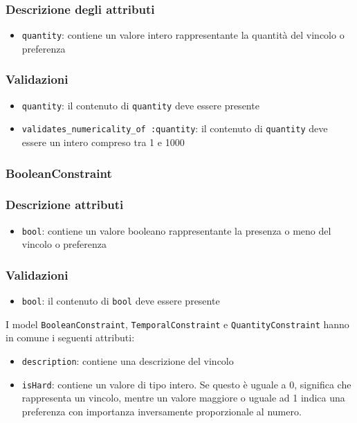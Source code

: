 \documentclass[11pt,a4paper]{article}
\begin{document}
\subsubsection*{Descrizione degli attributi}
\begin{itemize}
 \item \verb|quantity|: contiene un valore intero rappresentante la quantità del vincolo o preferenza
\end{itemize}
\subsubsection*{Validazioni}
\begin{itemize}
 \item \verb|quantity|: il contenuto di \verb|quantity| deve essere presente
 \item \verb|validates_numericality_of :quantity|: il contenuto di \verb|quantity| deve essere un intero compreso tra 1 e 1000 
\end{itemize}
\subsubsection{BooleanConstraint}
\subsubsection*{Descrizione attributi}
\begin{itemize}
 \item \verb|bool|: contiene un valore booleano rappresentante la presenza o meno del vincolo o preferenza
\end{itemize}
\subsubsection*{Validazioni}
\begin{itemize}
 \item \verb|bool|: il contenuto di \verb|bool| deve essere presente
\end{itemize}
I model \verb|BooleanConstraint|, \verb|TemporalConstraint| e \verb|QuantityConstraint|
hanno in comune i seguenti attributi:
\begin{itemize}
 \item \verb|description|: contiene una descrizione del vincolo
 \item \verb|isHard|: contiene un valore di tipo intero. Se questo è uguale a 0, significa che rappresenta un vincolo, mentre un valore maggiore o uguale ad 1 indica una preferenza con importanza inversamente proporzionale al numero.
 \end{itemize}
\end{document}
